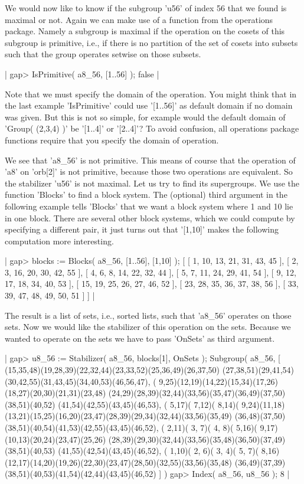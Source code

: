 We would now like to know if the subgroup 'u56' of index 56 that we found
is  maximal or  not.   Again  we can make  use  of  a function  from  the
operations package.  Namely a subgroup is maximal if the operation on the
cosets of  this subgroup is primitive, i.e., if there is no  partition of
the  set of  cosets into subsets such that  the group operates setwise on
those subsets.

|    gap> IsPrimitive( a8_56, [1..56] );
    false |

Note that we must specify  the domain of the operation.  You  might think
that in  the last  example 'IsPrimitive' could  use  '[1..56]' as default
domain if  no domain was given.  But  this is not so simple,  for example
would the default domain of 'Group( (2,3,4) )'  be '[1..4]' or  '[2..4]'?
To avoid  confusion, all  operations  package functions require  that you
specify the domain of operation.

We see that 'a8\_56' is  not  primitive.  This means of course  that  the
operation of  'a8'  on  'orb[2]'  is  not  primitive,  because  those two
operations are equivalent.   So the stabilizer 'u56' is not maximal.  Let
us  try to find its supergroups.  We use the  function 'Blocks' to find a
block  system.   The (optional) third argument  in the following  example
tells 'Blocks' that we  want a  block  system where  1 and 10 lie in  one
block.  There are several other block systems, which we could compute  by
specifying a  different pair, it just  turns out that  '[1,10]' makes the
following computation more interesting.

|    gap> blocks := Blocks( a8_56, [1..56], [1,10] );
    [ [ 1, 10, 13, 21, 31, 43, 45 ], [ 2, 3, 16, 20, 30, 42, 55 ],
      [ 4, 6, 8, 14, 22, 32, 44 ], [ 5, 7, 11, 24, 29, 41, 54 ],
      [ 9, 12, 17, 18, 34, 40, 53 ], [ 15, 19, 25, 26, 27, 46, 52 ],
      [ 23, 28, 35, 36, 37, 38, 56 ], [ 33, 39, 47, 48, 49, 50, 51 ] ] |

The result is a  list of  sets,  i.e., sorted  lists,  such that 'a8\_56'
operates on  those  sets.  Now  we  would  like  the  stabilizer of  this
operation on the sets.  Because  we wanted to operate on the sets we have
to pass 'OnSets' as third argument.

|    gap> u8_56 := Stabilizer( a8_56, blocks[1], OnSets );
    Subgroup( a8_56,
    [ (15,35,48)(19,28,39)(22,32,44)(23,33,52)(25,36,49)(26,37,50)
        (27,38,51)(29,41,54)(30,42,55)(31,43,45)(34,40,53)(46,56,47),
      ( 9,25)(12,19)(14,22)(15,34)(17,26)(18,27)(20,30)(21,31)(23,48)
        (24,29)(28,39)(32,44)(33,56)(35,47)(36,49)(37,50)(38,51)(40,52)
        (41,54)(42,55)(43,45)(46,53), ( 5,17)( 7,12)( 8,14)( 9,24)(11,18)
        (13,21)(15,25)(16,20)(23,47)(28,39)(29,34)(32,44)(33,56)(35,49)
        (36,48)(37,50)(38,51)(40,54)(41,53)(42,55)(43,45)(46,52),
      ( 2,11)( 3, 7)( 4, 8)( 5,16)( 9,17)(10,13)(20,24)(23,47)(25,26)
        (28,39)(29,30)(32,44)(33,56)(35,48)(36,50)(37,49)(38,51)(40,53)
        (41,55)(42,54)(43,45)(46,52), ( 1,10)( 2, 6)( 3, 4)( 5, 7)( 8,16)
        (12,17)(14,20)(19,26)(22,30)(23,47)(28,50)(32,55)(33,56)(35,48)
        (36,49)(37,39)(38,51)(40,53)(41,54)(42,44)(43,45)(46,52) ] )
    gap> Index( a8_56, u8_56 );
    8 |

